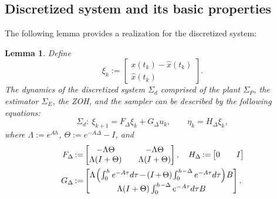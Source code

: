 \documentclass[letterpaper, 12pt, draftcls, onecolumn]{ieeeconf}
\newtheorem{lemma}[theorem]{Lemma}
\begin{document}
\subsection{Discretized system and its basic properties}
The following lemma provides a realization for the discretized system:
\begin{lemma}
	\label{lem:discretization}
	Define 
	\begin{equation*}
	\xi_k :=  
	\begin{bmatrix}
	x(t_k) - \hat x(t_k) \\
	\hat x(t_k)
	\end{bmatrix}.
	\end{equation*}
	The dynamics of 
	the discretized system $\Sigma_d$ 
	comprised of the plant $\Sigma_P$, the estimator $\Sigma_E$, 
	the ZOH, and the sampler
	can be described by the following equations:
	\begin{equation}
	\label{eq:extended_sys}
	\Sigma_d:~
	\xi_{k+1} = F_{\Delta} \xi_k + G_{\Delta} u_k,\qquad \eta_k = H_{\Delta}\xi_k,
	\end{equation}
	where $\Lambda := e^{Ah}$,
	$\Theta := e^{-A\Delta} - I$, and
	\begin{align}
	F_{\Delta} &\hspace{-1pt}:=\hspace{-1pt}
	\begin{bmatrix}
	-\Lambda \Theta &\quad  -\Lambda\Theta \\
	\Lambda (I + \Theta)  &\quad  \Lambda (I + \Theta) 
	\end{bmatrix},\quad
	H_{\Delta}  \hspace{-1pt}:=\hspace{-1pt}
	\begin{bmatrix}
	0 &\quad I
	\end{bmatrix}
	\notag \\
	G_{\Delta} &\hspace{-1pt}:=\hspace{-1pt}
	\begin{bmatrix}
	\Lambda \hspace{-1pt}
	\left(
	\int^h_0 e^{-A\tau} d\tau
	\hspace{-1pt}-\hspace{-1pt}
	(I \hspace{-1pt}+\hspace{-1pt} \Theta) \hspace{-1pt}
	\int^{h-\Delta}_0 e^{-A\tau} d\tau
	\right) \hspace{-1pt}
	B  \\
	\Lambda (I + \Theta)   \int^{h-\Delta}_0 e^{-A\tau} d\tau B 
	\end{bmatrix}. \label{eq:FGH_def} 
	\end{align}
\end{lemma}
\end{document}

